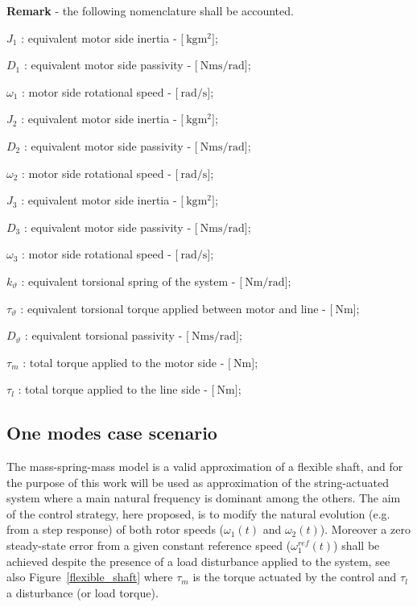 \documentclass[12pt,a4paper]{scrartcl}
\begin{document}
\begin{onehalfspace}
\noindent\textbf{Remark} - the following nomenclature shall be accounted. 
\begin{myitemize_1}
	\item[--] $J_1$ : equivalent motor side inertia - $\Big[\SI{}{\kilogram\square\meter}\Big]$;	
	\item[--] $D_1$ : equivalent motor side passivity - $\Big[\SI{}{\newton\meter\second\per\radian}\Big]$;
	\item[--] $\omega_1$ : motor side rotational speed - $\Big[\SI{}{\radian\per\second}\Big]$;
	\item[--] $J_2$ : equivalent motor side inertia - $\Big[\SI{}{\kilogram\square\meter}\Big]$;	
	\item[--] $D_2$ : equivalent motor side passivity - $\Big[\SI{}{\newton\meter\second\per\radian}\Big]$;
	\item[--] $\omega_2$ : motor side rotational speed - $\Big[\SI{}{\radian\per\second}\Big]$;
	\item[--] $J_3$ : equivalent motor side inertia - $\Big[\SI{}{\kilogram\square\meter}\Big]$;	
	\item[--] $D_3$ : equivalent motor side passivity - $\Big[\SI{}{\newton\meter\second\per\radian}\Big]$;
	\item[--] $\omega_3$ : motor side rotational speed - $\Big[\SI{}{\radian\per\second}\Big]$;
	\item[--] $k_\vartheta$ : equivalent torsional spring of the system - $\Big[\SI{}{\newton\meter\per\radian}\Big]$;
	\item[--] $\tau_\vartheta$ : equivalent torsional torque applied between motor and line - $\Big[\SI{}{\newton\meter}\Big]$;
	\item[--] $D_\vartheta$ : equivalent torsional passivity - $\Big[\SI{}{\newton\meter\second\per\radian}\Big]$;
	\item[--] $\tau_m$ : total torque applied to the motor side - $\Big[\SI{}{\newton\meter}\Big]$;
\item[--] $\tau_l$ : total torque applied to the line side - $\Big[\SI{}{\newton\meter}\Big]$;
\end{myitemize_1}

\subsection{One modes case scenario} 
The mass-spring-mass model is a valid approximation of a flexible shaft, and for the purpose of this work will be used as approximation of the string-actuated system where a main natural frequency is dominant among the others. The 
aim of the control strategy, here proposed, is to modify the natural evolution (e.g. from a step response) of both rotor speeds ($\omega_1(t)$ and $\omega_2(t)$). Moreover a zero steady-state error from a given constant reference speed ($\omega_1^{ref}(t)$) shall be achieved despite the presence of a load disturbance applied to the system, see also Figure~\ref{flexible_shaft} where $\tau_m$ 
is the torque actuated by the control and $\tau_l$ a disturbance (or load torque).


\end{onehalfspace}
\end{document}

